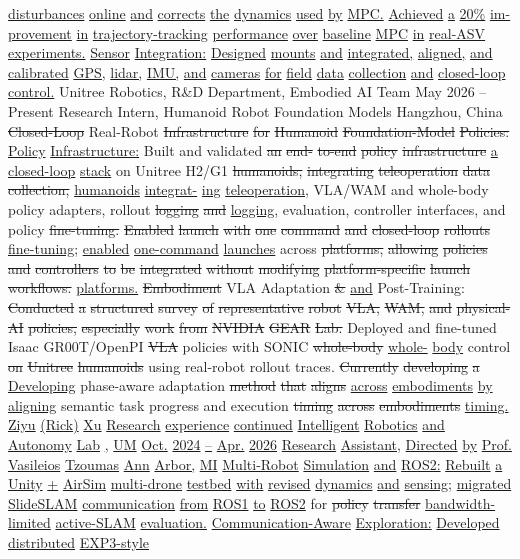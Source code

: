 \documentclass[10pt,letterpaper]{article}
\newcommand{\del}[1]{{\color{red}\sout{#1}}}
\newcommand{\add}[1]{{\color{blue}\uline{#1}}}
\begin{document}
\add{disturbances} \add{online} \add{and} \add{corrects} \add{the} \add{dynamics} \add{used} \add{by} \add{MPC.} \add{Achieved} \add{a} \add{20\%} \add{im-} \add{provement} \add{in} \add{trajectory-tracking} \add{performance} \add{over} \add{baseline} \add{MPC} \add{in} \add{real-ASV} \add{experiments.} \add{} \add{Sensor} \add{Integration:} \add{Designed} \add{mounts} \add{and} \add{integrated,} \add{aligned,} \add{and} \add{calibrated} \add{GPS,} \add{lidar,} \add{IMU,} \add{and} \add{cameras} \add{for} \add{field} \add{data} \add{collection} \add{and} \add{closed-loop} \add{control.} Unitree Robotics, R\&D Department, Embodied AI Team May 2026 -- Present Research Intern, Humanoid Robot Foundation Models Hangzhou, China  \del{Closed-Loop} Real-Robot \del{Infrastructure} \del{for} \del{Humanoid} \del{Foundation-Model} \del{Policies:} \add{Policy} \add{Infrastructure:} Built and validated \del{an} \del{end-} \del{to-end} \del{policy} \del{infrastructure} \add{a} \add{closed-loop} \add{stack} on Unitree H2/G1 \del{humanoids,} \del{integrating} \del{teleoperation} \del{data} \del{collection,} \add{humanoids} \add{integrat-} \add{ing} \add{teleoperation,} VLA/WAM and whole-body policy adapters, rollout \del{logging} \del{and} \add{logging,} evaluation, controller interfaces, and policy \del{fine-tuning.} \del{Enabled} \del{launch} \del{with} \del{one} \del{command} \del{and} \del{closed-loop} \del{rollouts} \add{fine-tuning;} \add{enabled} \add{one-command} \add{launches} across \del{platforms,} \del{allowing} \del{policies} \del{and} \del{controllers} \del{to} \del{be} \del{integrated} \del{without} \del{modifying} \del{platform-specific} \del{launch} \del{workflows.} \add{platforms.}  \del{Embodiment} VLA Adaptation \del{\&} \add{and} Post-Training: \del{Conducted} \del{a} \del{structured} \del{survey} \del{of} \del{representative} \del{robot} \del{VLA,} \del{WAM,} \del{and} \del{physical-AI} \del{policies,} \del{especially} \del{work} \del{from} \del{NVIDIA} \del{GEAR} \del{Lab.} Deployed and fine-tuned Isaac GR00T/OpenPI \del{VLA} policies with SONIC \del{whole-body} \add{whole-} \add{body} control \del{on} \del{Unitree} \del{humanoids} using real-robot rollout traces. \del{Currently} \del{developing} \del{a} \add{Developing} phase-aware adaptation \del{method} \del{that} \del{aligns} \add{across} \add{embodiments} \add{by} \add{aligning} semantic task progress and execution \del{timing} \del{across} \del{embodiments} \add{timing.} \add{Ziyu} \add{(Rick)} \add{Xu} \add{Research} \add{experience} \add{continued} \add{Intelligent} \add{Robotics} \add{and} \add{Autonomy} \add{Lab} \add{,} \add{UM} \add{Oct.} \add{2024} \add{--} \add{Apr.} \add{2026} \add{Research} \add{Assistant,} \add{Directed} \add{by} \add{Prof.} \add{Vasileios} \add{Tzoumas} \add{Ann} \add{Arbor,} \add{MI} \add{} \add{Multi-Robot} \add{Simulation} \add{and} \add{ROS2:} \add{Rebuilt} \add{a} \add{Unity} \add{+} \add{AirSim} \add{multi-drone} \add{testbed} \add{with} \add{revised} \add{dynamics} \add{and} \add{sensing;} \add{migrated} \add{SlideSLAM} \add{communication} \add{from} \add{ROS1} \add{to} \add{ROS2} for \del{policy} \del{transfer} \add{bandwidth-limited} \add{active-SLAM} \add{evaluation.} \add{} \add{Communication-Aware} \add{Exploration:} \add{Developed} \add{distributed} \add{EXP3-style} 
\end{document}
